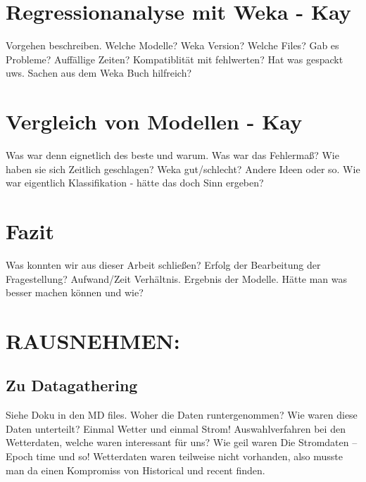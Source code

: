 \documentclass[letterpaper]{article} %
\begin{document}
\section*{Regressionanalyse mit Weka - Kay}
    Vorgehen beschreiben. Welche Modelle? Weka Version? Welche Files? Gab es Probleme? Auffällige Zeiten? Kompatiblität mit fehlwerten? Hat was gespackt uws. Sachen aus dem Weka Buch hilfreich?
\section*{Vergleich von Modellen - Kay}
    Was war denn eignetlich des beste und warum. Was war das Fehlermaß? Wie haben sie sich Zeitlich geschlagen? Weka gut/schlecht? Andere Ideen oder so. Wie war eigentlich Klassifikation - hätte das doch Sinn ergeben?
\section*{Fazit}
    Was konnten wir aus dieser Arbeit schließen? Erfolg der Bearbeitung der Fragestellung? Aufwand/Zeit Verhältnis. Ergebnis der Modelle. Hätte man was besser machen können und wie?
    


\section{RAUSNEHMEN:}
\subsection*{Zu Datagathering}        
    Siehe Doku in den MD files. Woher die Daten runtergenommen? Wie waren diese Daten unterteilt? Einmal Wetter und einmal Strom! Auswahlverfahren bei den Wetterdaten, welche waren interessant für uns? Wie geil waren Die Stromdaten -- Epoch time und so! Wetterdaten waren teilweise nicht vorhanden, also musste man da einen Kompromiss von Historical und recent finden. 
        \\\\\\\\\\\\
\end{document}
